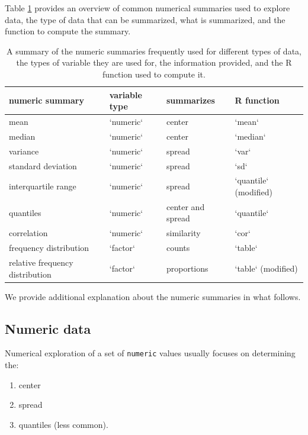 \documentclass[
]{book}
\providecommand{\tightlist}{%
  \setlength{\itemsep}{0pt}\setlength{\parskip}{0pt}}
\theoremstyle{definition}
\theoremstyle{definition}
\theoremstyle{definition}
\theoremstyle{definition}
\theoremstyle{remark}
\begin{document}
Table \ref{tab:numsum-table} provides an overview of common numerical summaries used to explore data, the type of data that can be summarized, what is summarized, and the function to compute the summary.

\begin{table}

\caption{\label{tab:numsum-table}A summary of the numeric summaries frequently used for different types of data, the types of variable they are used for, the information provided, and the R function used to compute it.}
\centering
\begin{tabular}[t]{llll}
\toprule
numeric summary & variable type & summarizes & R function\\
\midrule
mean & `numeric` & center & `mean`\\
median & `numeric` & center & `median`\\
variance & `numeric` & spread & `var`\\
standard deviation & `numeric` & spread & `sd`\\
interquartile range & `numeric` & spread & `quantile` (modified)\\
\addlinespace
quantiles & `numeric` & center and spread & `quantile`\\
correlation & `numeric` & similarity & `cor`\\
frequency  distribution & `factor` & counts & `table`\\
relative frequency distribution & `factor` & proportions & `table` (modified)\\
\bottomrule
\end{tabular}
\end{table}

We provide additional explanation about the numeric summaries in what follows.

\hypertarget{numeric-data}{%
\subsection{Numeric data}\label{numeric-data}}

Numerical exploration of a set of \texttt{numeric} values usually focuses on determining the:

\begin{enumerate}
\def\labelenumi{\arabic{enumi}.}
\tightlist
\item
  center
\item
  spread
\item
  quantiles (less common).
\end{enumerate}
\end{document}

